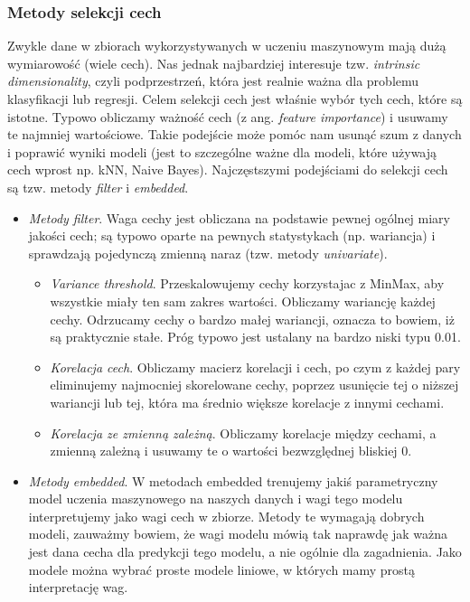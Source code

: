 \documentclass{myclass}
\numberwithin{equation}{subsection}
\begin{document}
\subsubsection{Metody selekcji cech}

Zwykle dane w zbiorach wykorzystywanych w uczeniu maszynowym mają dużą wymiarowość (wiele cech). Nas
jednak najbardziej interesuje tzw. \textit{intrinsic dimensionality}, czyli podprzestrzeń, która
jest realnie ważna dla problemu klasyfikacji lub regresji. Celem selekcji cech jest właśnie wybór
tych cech, które są istotne. Typowo obliczamy ważność cech (z ang. \textit{feature importance}) i
usuwamy te najmniej wartościowe. Takie podejście może pomóc nam usunąć szum z danych i poprawić
wyniki modeli (jest to szczególne ważne dla modeli, które używają cech wprost np. kNN, Naive Bayes).
Najczęstszymi podejściami do selekcji cech są tzw. metody \textit{filter} i \textit{embedded}.
\begin{itemize}
    
    \item \emph{Metody \textit{filter}}. Waga cechy jest obliczana na podstawie pewnej ogólnej miary
    jakości cech; są typowo oparte na pewnych statystykach (np. wariancja) i sprawdzają pojedynczą
    zmienną naraz (tzw. metody \textit{univariate}).
    
    \begin{itemize}

        \item \emph{\textit{Variance threshold}}. Przeskalowujemy cechy korzystajac z MinMax, aby
        wszystkie miały ten sam zakres wartości. Obliczamy wariancję każdej cechy. Odrzucamy cechy o
        bardzo małej wariancji, oznacza to bowiem, iż są praktycznie stałe. Próg typowo jest
        ustalany na bardzo niski typu 0.01.

        \item \emph{Korelacja cech}. Obliczamy macierz korelacji i cech, po czym z każdej pary
        eliminujemy najmocniej skorelowane cechy, poprzez usunięcie tej o niższej wariancji lub tej,
        która ma średnio większe korelacje z innymi cechami.

        \item \emph{Korelacja ze zmienną zależną}. Obliczamy korelacje między cechami, a zmienną
        zależną i usuwamy te o wartości bezwzględnej bliskiej 0. 

    \end{itemize}

    \item \emph{Metody \textit{embedded}}. W metodach embedded trenujemy jakiś parametryczny model
    uczenia maszynowego na naszych danych i wagi tego modelu interpretujemy jako wagi cech w
    zbiorze. Metody te wymagają dobrych modeli, zauważmy bowiem, że wagi modelu mówią tak naprawdę
    jak ważna jest dana cecha dla predykcji tego modelu, a nie ogólnie dla zagadnienia. Jako modele
    można wybrać proste modele liniowe, w których mamy prostą interpretację wag.

\end{itemize}
\end{document}
